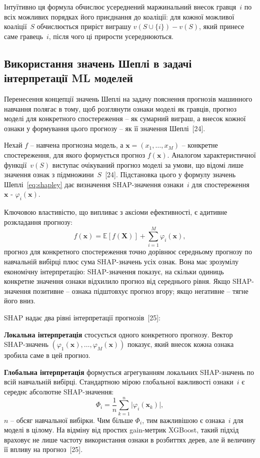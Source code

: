 \documentclass{bachelor_thesis}
\begin{document}
Інтуїтивно ця формула обчислює усереднений маржинальний внесок гравця~$i$ по всіх можливих порядках його приєднання до коаліції: для кожної можливої коаліції~$S$ обчислюється приріст виграшу $v(S \cup \{i\}) - v(S)$, який принесе саме гравець~$i$, після чого ці прирости усереднюються.

\subsection{Використання значень Шеплі в задачі інтерпретації ML моделей}

Перенесення концепції значень Шеплі на задачу пояснення прогнозів машинного навчання полягає в тому, щоб розглянути ознаки моделі як гравців, прогноз моделі для конкретного спостереження -- як сумарний виграш, а внесок кожної ознаки у формування цього прогнозу -- як її значення Шеплі~[24].

Нехай $f$ -- навчена прогнозна модель, а $\mathbf{x} = (x_1, \ldots, x_M)$ -- конкретне спостереження, для якого формується прогноз $f(\mathbf{x})$. Аналогом характеристичної функції~$v(S)$ виступає очікуваний прогноз моделі за умови, що відомі лише значення ознак з підмножини~$S$~[24]. Підстановка цього у формулу значень Шеплі~\eqref{eq:shapley} дає визначення SHAP-значення ознаки~$i$ для спостереження~$\mathbf{x}$ - $\varphi_i(\mathbf{x})$.

Ключовою властивістю, що випливає з аксіоми ефективності, є адитивне розкладання прогнозу:
\begin{equation*}
f(\mathbf{x}) = \mathbb{E}[f(\mathbf{X})] + \sum_{i=1}^{M} \varphi_i(\mathbf{x}),
\end{equation*}
 прогноз для конкретного спостереження точно дорівнює середньому прогнозу по навчальній вибірці плюс сума SHAP-значень усіх ознак. Вона має зрозумілу економічну інтерпретацію: SHAP-значення показує, на скільки одиниць конкретне значення ознаки відхилило прогноз від середнього рівня. Якщо SHAP-значення позитивне -- ознака підштовхує прогноз вгору; якщо негативне -- тягне його вниз.

SHAP надає два рівні інтерпретації прогнозів~[25]:

\textbf{Локальна інтерпретація} стосується одного конкретного прогнозу. Вектор SHAP-значень $(\varphi_1(\mathbf{x}), \ldots, \varphi_M(\mathbf{x}))$ показує, який внесок кожна ознака зробила саме в цей прогноз.

\textbf{Глобальна інтерпретація} формується агрегуванням локальних SHAP-значень по всій навчальній вибірці. Стандартною мірою глобальної важливості ознаки~$i$ є середнє абсолютне SHAP-значення:
\begin{equation}\label{eq:shap_global}
\Phi_i = \frac{1}{n} \sum_{k=1}^{n} \bigl|\varphi_i(\mathbf{x}_k)\bigr|,
\end{equation}
 $n$ -- обсяг навчальної вибірки. Чим більше $\Phi_i$, тим важливішою є ознака~$i$ для моделі в цілому. На відміну від простих gain-метрик XGBoost, такий підхід враховує не лише частоту використання ознаки в розбиттях дерев, але й величину її впливу на прогноз~[25].
\end{document}
